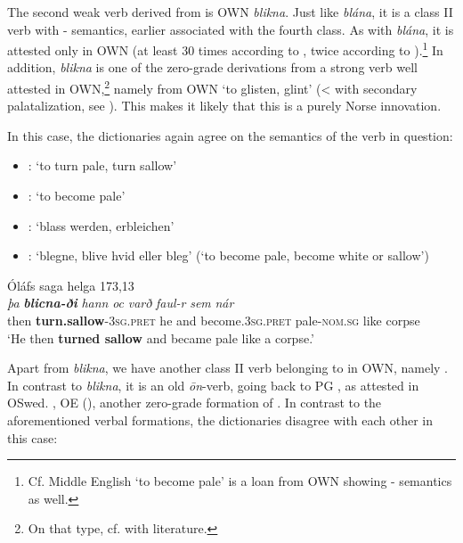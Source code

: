 \documentclass[output=paper,colorlinks,citecolor=brown]{langscibook}
\begin{document}
The second weak verb derived from  is OWN \textit{blikna}. Just like \textit{blána}, it is a class II verb with - semantics, earlier associated with the fourth class. As with \textit{blána}, it is attested only in OWN (at least 30 times according to , twice according to ).\footnote{Cf. Middle English  ‘to become pale’ is a loan from OWN showing - semantics as well.} In addition, \textit{blikna} is one of the zero-grade derivations from a strong verb well attested in OWN,\footnote{On that type, cf. \citet[344]{Ottosson2013} with literature.} namely from OWN  ‘to glisten, glint’ (<  with secondary palatalization, see ). This makes it likely that this is a purely Norse innovation.

In this case, the dictionaries again agree on the semantics of the verb in question:

\begin{itemize}
\item {}: ‘to turn pale, turn sallow’
\item {}: ‘to become pale’
\item {}: ‘blass werden, erbleichen’
\item {}: ‘blegne, blive hvid eller bleg’ (‘to become pale, become white or sallow’)
\end{itemize}
 
\begin{exe} 
    \ex Óláfs saga helga 173,13 \label{ex:blikna}\\
    \gll \textit{þa} {\textit{\textbf{blicna-ði}} } \textit{hann} \textit{oc} \textit{varð} \textit{faul-r} \textit{sem} \textit{nár}\\
       then \textbf{turn.sallow}-\textsc{3sg.pret} he and become.\textsc{3sg.pret} pale-\textsc{nom.sg} like corpse\\
    \glt ‘He then \textbf{turned sallow} and became pale like a corpse.’
\end{exe}

Apart from \textit{blikna}, we have another class II verb belonging to  in OWN, namely . In contrast to \textit{blikna}, it is an old \textit{ōn}-verb, going back to PG , as attested in OSwed. , OE  (), another zero-grade formation of . In contrast to the aforementioned verbal formations, the dictionaries disagree with each other in this case:
\end{document}
